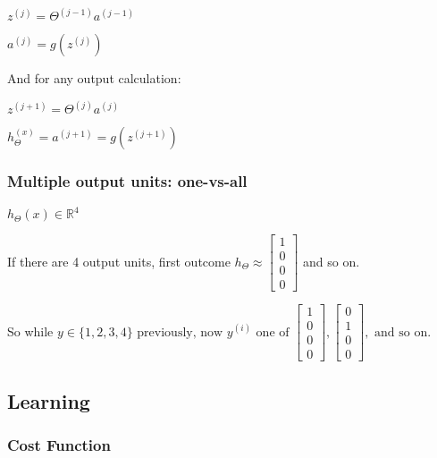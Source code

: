 \documentclass[12pt, a4paper]{article}
\begin{document}
      $z^{(j)} = \Theta^{(j-1)}a^{(j-1)}$

      $a^{(j)} = g(z^{(j)})$

      And for any output calculation:

      $z^{(j+1)} = \Theta^{(j)}a^{(j)}$

      $h_\Theta^{(x)} = a^{(j+1)} = g(z^{(j+1)})$
    
    \subsubsection{Multiple output units: one-vs-all}

      $h_\Theta(x) \in \mathbb{R}^4$
      
      If there are 4 output units, first outcome $h_\Theta \approx 
      \begin{bmatrix} 1 \\ 0 \\ 0 \\ 0 \end{bmatrix}$ and so on. 

      So while $y \in\{1,2,3,4\} \text{ previously, now } y^{(i)} 
      \text{ one of } \begin{bmatrix} 1 \\ 0 \\ 0 \\ 0 \end{bmatrix},
      \begin{bmatrix} 0 \\ 1 \\ 0 \\ 0 \end{bmatrix}, \text{ and so on}.$

  \subsection{Learning}

    \subsubsection{Cost Function}
\end{document}
